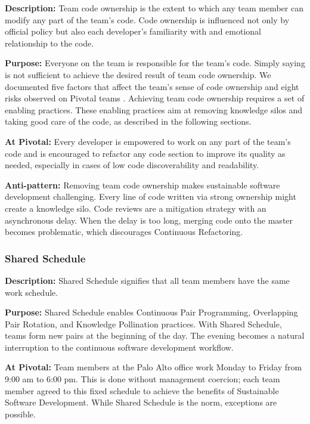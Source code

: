 \textbf{Description:} Team code ownership is the extent to which any team member can modify any part of the team's code. Code ownership is influenced not only by official policy but also each developer's familiarity with and emotional relationship to the code.

\textbf{Purpose:} Everyone on the team is responsible for the team’s code. Simply saying  is not sufficient to achieve the desired result of team code ownership. We documented five factors that affect the team’s sense of code ownership and eight risks observed on Pivotal teams \cite{SedanoTeamCodeOwnership}. Achieving team code ownership requires a set of enabling practices. These enabling practices aim at removing knowledge silos and taking good care of the code, as described in the following sections.

\textbf{At Pivotal:} Every developer is empowered to work on any part of the team’s code and is encouraged to refactor any code section to improve its quality as needed, especially in cases of low code discoverability and readability.

\textbf{Anti-pattern:} Removing team code ownership makes sustainable software development challenging. Every line of code written via strong ownership might create a knowledge silo. Code reviews are a mitigation strategy with an asynchronous delay. When the delay is too long, merging code onto the master becomes problematic, which discourages Continuous Refactoring. 

\subsubsection{Shared Schedule}
\textbf{Description:} Shared Schedule signifies that all team members have the same work schedule. 

\textbf{Purpose:} Shared Schedule enables Continuous Pair Programming, Overlapping Pair Rotation, and Knowledge Pollination practices. With Shared Schedule, teams form new pairs at the beginning of the day. The evening becomes a natural interruption to the continuous software development workflow. 

\textbf{At Pivotal:} Team members at the Palo Alto office work Monday to Friday from 9:00 am to 6:00 pm. This is done without management coercion; each team member agreed to this fixed schedule to achieve the benefits of Sustainable Software Development. While Shared Schedule is the norm, exceptions are possible. 

